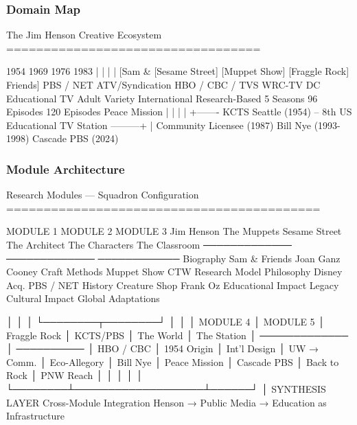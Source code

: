\documentclass[11pt,letterpaper]{article}
\begin{document}
\subsubsection{Domain Map}

\begin{asciibox}
The Jim Henson Creative Ecosystem
==================================

  1954                    1969                    1976                    1983
   |                       |                       |                       |
 [Sam &               [Sesame Street]         [Muppet Show]         [Fraggle Rock]
Friends]              PBS / NET               ATV/Syndication        HBO / CBC / TVS
WRC-TV DC             Educational TV          Adult Variety           International
                      Research-Based          5 Seasons               96 Episodes
                                              120 Episodes            Peace Mission
    |                       |                       |                       |
    +------- KCTS Seattle (1954) -- 8th US Educational TV Station ---------+
                    |
            Community Licensee (1987)
            Bill Nye (1993-1998)
            Cascade PBS (2024)
\end{asciibox}

\subsubsection{Module Architecture}

\begin{asciibox}
Research Modules — Squadron Configuration
==========================================

  MODULE 1          MODULE 2          MODULE 3
  Jim Henson        The Muppets       Sesame Street
  The Architect     The Characters    The Classroom
  ─────────────     ─────────────     ────────────
  Biography         Sam & Friends     Joan Ganz Cooney
  Craft Methods     Muppet Show       CTW Research Model
  Philosophy        Disney Acq.       PBS / NET History
  Creature Shop     Frank Oz          Educational Impact
  Legacy            Cultural Impact   Global Adaptations

        │                 │                 │
        └────────┬────────┘                 │
                 │                          │
  MODULE 4       │              MODULE 5    │
  Fraggle Rock   │              KCTS/PBS    │
  The World      │              The Station │
  ─────────────  │              ──────────  │
  HBO / CBC      │              1954 Origin │
  Int'l Design   │              UW → Comm.  │
  Eco-Allegory   │              Bill Nye    │
  Peace Mission  │              Cascade PBS │
  Back to Rock   │              PNW Reach   │
        │        │                   │      │
        └────────┴───────────────────┴──────┘
                            │
                     SYNTHESIS LAYER
                   Cross-Module Integration
                   Henson → Public Media →
                   Education as Infrastructure
\end{asciibox}
\end{document}
